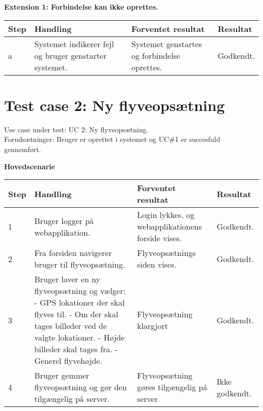\textbf{Extension 1: Forbindelse kan ikke oprettes.}
\begin{table}[H]
	\centering
		\begin{tabular}{|l|p{5 cm}|p{5 cm}|p{2.5 cm}|} 
		\hline
			\textbf{Step} & \textbf{Handling} & \textbf{Forventet resultat} & \textbf{Resultat} \\ \hline
			a & Systemet indikerer fejl og bruger genstarter systemet. & Systemet genstartes og \newline forbindelse oprettes. & Godkendt. \\ \hline
		\end{tabular}
\end{table}

\newpage
\section{Test case 2: Ny flyveopsætning}
Use case under test: UC 2: Ny flyveopsætning.\\
Forudsætninger:	Bruger er oprettet i systemet og UC\#1 er succesfuld gennemført.

\textbf{Hovedscenarie}
\begin{table}[H]
	\centering
		\begin{tabular}{|l|p{5 cm}|p{5 cm}|p{2.5 cm}|}
		\hline
			\textbf{Step} & \textbf{Handling} & \textbf{Forventet resultat} & \textbf{Resultat} \\ \hline
			1 & Bruger logger på \newline webapplikation. & Login lykkes, og webapplikationens forside vises. & Godkendt. \\ \hline
			2 & Fra forsiden navigerer bruger til flyveopsætning. & Flyveopsætnings siden vises. & Godkendt. \\ \hline
			3 & Bruger laver en ny \newline flyveopsætning og vælger: \newline
				- GPS lokationer der \newline skal flyves til. \newline
				- Om der skal tages billeder ved de valgte lokationer. \newline
				- Højde billeder skal tages fra. \newline
				- Generel flyvehøjde.				
				 & Flyveopsætning klargjort & Godkendt. \\ \hline
			4 & Bruger gemmer flyveopsætning og gør den tilgængelig på server. & Flyveopsætning gøres \newline tilgængelig på server & Ikke godkendt. \\ \hline
		\end{tabular}
\end{table}

